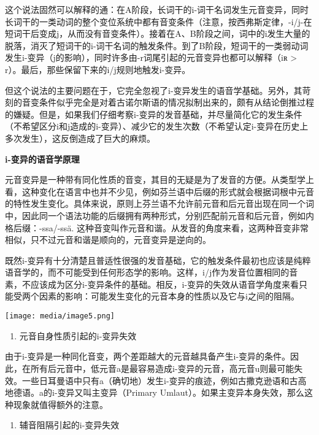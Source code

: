 这个说法固然可以解释的通：在A阶段，长词干的i-词干名词发生元音变异，同时长词干的一类动词的整个变位系统中都有音变条件（注意，按西弗斯定律，-i/j-在短词干后变成j，从而没有音变条件）。接着在A、B阶段之间，词中的i发生大量的脱落，消灭了短词干的i-词干名词的触发条件。到了B阶段，短词干的一类弱动词发生i-变异（j的影响），同时许多由-r词尾引起的元音变异也都可以解释（iʀ
\textgreater{} r）。最后，那些保留下来的i/j规则地触发i-变异。

但这个说法的主要问题在于，它完全忽视了i-变异发生的语音学基础。另外，其苛刻的音变条件似乎完全是对着古诺尔斯语的情况拟制出来的，颇有从结论倒推过程的嫌疑。但是，如果我们仔细考察i-变异的发音基础，并尽量简化它的发生条件（不希望区分i和j造成的i-变异）、减少它的发生次数（不希望认定i-变异在历史上多次发生），这反倒造成了巨大的麻烦。

\textbf{i-变异的语音学原理}

元音变异是一种带有同化性质的音变，其目的无疑是为了发音的方便。从类型学上看，这种变化在语言中也并不少见，例如芬兰语中后缀的形式就会根据词根中元音的特性发生变化。具体来说，原则上芬兰语不允许前元音和后元音出现在同一个词中，因此同一个语法功能的后缀拥有两种形式，分别匹配前元音和后元音，例如内格后缀：-ssa/-ssä.
这种音变叫作元音和谐。从发音的角度来看，这两种音变非常相似，只不过元音和谐是顺向的，元音变异是逆向的。

既然i-变异有十分清楚且普适性很强的发音基础，它的触发条件最初也应该是纯粹语音学的，而不可能受到任何形态学的影响。这样，i/j作为发音位置相同的音素，不应该成为区分i-变异条件的基础。相反，i-变异的失效从语音学角度来看只能受两个因素的影响：可能发生变化的元音本身的性质以及它与i之间的阻隔。

\texttt{[image: media/image5.png]}

\begin{enumerate}
\def\labelenumi{\arabic{enumi})}
\item
  元音自身性质引起的i-变异失效
\end{enumerate}

由于i-变异是一种同化音变，两个差距越大的元音越具备产生i-变异的条件。因此，在所有后元音中，低元音a是最容易造成i-变异的元音，高元音u则最可能失效。一些日耳曼语中只有a（确切地）发生i-变异的痕迹，例如古撒克逊语和古高地德语。a的i-变异又叫主变异（Primary
Umlaut）。如果主变异本身失效，那么这种现象就值得额外的注意。

\begin{enumerate}
\def\labelenumi{\arabic{enumi})}
\setcounter{enumi}{1}
\item
  辅音阻隔引起的i-变异失效
\end{enumerate}

